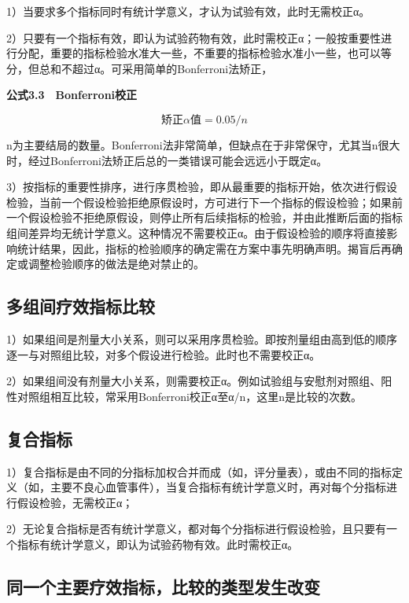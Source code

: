 \documentclass[
  chinese-hans,
  letterpaper,
  DIV=11,
  numbers=noendperiod]{scrreprt}
\begin{document}
1）当要求多个指标同时有统计学意义，才认为试验有效，此时无需校正α。

2）只要有一个指标有效，即认为试验药物有效，此时需校正α；一般按重要性进行分配，重要的指标检验水准大一些，不重要的指标检验水准小一些，也可以等分，但总和不超过α。可采用简单的Bonferroni法矫正，

\textbf{公式3.3　Bonferroni校正}

\[\text{矫正}\alpha\text{值} = 0.05/n\]

n为主要结局的数量。Bonferroni法非常简单，但缺点在于非常保守，尤其当n很大时，经过Bonferroni法矫正后总的一类错误可能会远远小于既定α。

3）按指标的重要性排序，进行序贯检验，即从最重要的指标开始，依次进行假设检验，当前一个假设检验拒绝原假设时，方可进行下一个指标的假设检验；如果前一个假设检验不拒绝原假设，则停止所有后续指标的检验，并由此推断后面的指标组间差异均无统计学意义。这种情况不需要校正α。由于假设检验的顺序将直接影响统计结果，因此，指标的检验顺序的确定需在方案中事先明确声明。揭盲后再确定或调整检验顺序的做法是绝对禁止的。

\subsection{多组间疗效指标比较}\label{ux591aux7ec4ux95f4ux7597ux6548ux6307ux6807ux6bd4ux8f83}

1）如果组间是剂量大小关系，则可以采用序贯检验。即按剂量组由高到低的顺序逐一与对照组比较，对多个假设进行检验。此时也不需要校正α。

2）如果组间没有剂量大小关系，则需要校正α。例如试验组与安慰剂对照组、阳性对照组相互比较，常采用Bonferroni校正α至α/n，这里n是比较的次数。

\subsection{复合指标}\label{ux590dux5408ux6307ux6807}

1）复合指标是由不同的分指标加权合并而成（如，评分量表），或由不同的指标定义（如，主要不良心血管事件），当复合指标有统计学意义时，再对每个分指标进行假设检验，无需校正α；

2）无论复合指标是否有统计学意义，都对每个分指标进行假设检验，且只要有一个指标有统计学意义，即认为试验药物有效。此时需校正α。

\subsection{同一个主要疗效指标，比较的类型发生改变}\label{ux540cux4e00ux4e2aux4e3bux8981ux7597ux6548ux6307ux6807ux6bd4ux8f83ux7684ux7c7bux578bux53d1ux751fux6539ux53d8}
\end{document}

